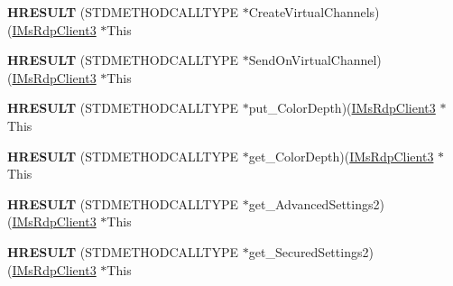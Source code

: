 \begin{DoxyCompactItemize}
\item 
\mbox{\label{struct_m_s_t_s_c_lib_1_1_i_ms_rdp_client3_vtbl_a3631c1ae51dd6c565051abc26541800d}} 
{\bfseries H\+R\+E\+S\+U\+LT} (S\+T\+D\+M\+E\+T\+H\+O\+D\+C\+A\+L\+L\+T\+Y\+PE $\ast$Create\+Virtual\+Channels)(\hyperlink{interface_m_s_t_s_c_lib_1_1_i_ms_rdp_client3}{I\+Ms\+Rdp\+Client3} $\ast$This
\item 
\mbox{\label{struct_m_s_t_s_c_lib_1_1_i_ms_rdp_client3_vtbl_ae84f077a75e3d63a4eda2acb2be5ecc7}} 
{\bfseries H\+R\+E\+S\+U\+LT} (S\+T\+D\+M\+E\+T\+H\+O\+D\+C\+A\+L\+L\+T\+Y\+PE $\ast$Send\+On\+Virtual\+Channel)(\hyperlink{interface_m_s_t_s_c_lib_1_1_i_ms_rdp_client3}{I\+Ms\+Rdp\+Client3} $\ast$This
\item 
\mbox{\label{struct_m_s_t_s_c_lib_1_1_i_ms_rdp_client3_vtbl_a34481798b381fbcd739f81d034606ba6}} 
{\bfseries H\+R\+E\+S\+U\+LT} (S\+T\+D\+M\+E\+T\+H\+O\+D\+C\+A\+L\+L\+T\+Y\+PE $\ast$put\+\_\+\+Color\+Depth)(\hyperlink{interface_m_s_t_s_c_lib_1_1_i_ms_rdp_client3}{I\+Ms\+Rdp\+Client3} $\ast$This
\item 
\mbox{\label{struct_m_s_t_s_c_lib_1_1_i_ms_rdp_client3_vtbl_aba402d5ea2b8f7d3ec2cf6477e00d201}} 
{\bfseries H\+R\+E\+S\+U\+LT} (S\+T\+D\+M\+E\+T\+H\+O\+D\+C\+A\+L\+L\+T\+Y\+PE $\ast$get\+\_\+\+Color\+Depth)(\hyperlink{interface_m_s_t_s_c_lib_1_1_i_ms_rdp_client3}{I\+Ms\+Rdp\+Client3} $\ast$This
\item 
\mbox{\label{struct_m_s_t_s_c_lib_1_1_i_ms_rdp_client3_vtbl_a8f5aecf69095f4f8102a2719c74065a9}} 
{\bfseries H\+R\+E\+S\+U\+LT} (S\+T\+D\+M\+E\+T\+H\+O\+D\+C\+A\+L\+L\+T\+Y\+PE $\ast$get\+\_\+\+Advanced\+Settings2)(\hyperlink{interface_m_s_t_s_c_lib_1_1_i_ms_rdp_client3}{I\+Ms\+Rdp\+Client3} $\ast$This
\item 
\mbox{\label{struct_m_s_t_s_c_lib_1_1_i_ms_rdp_client3_vtbl_a0a7b626f98e7cc9812939585dfe0546b}} 
{\bfseries H\+R\+E\+S\+U\+LT} (S\+T\+D\+M\+E\+T\+H\+O\+D\+C\+A\+L\+L\+T\+Y\+PE $\ast$get\+\_\+\+Secured\+Settings2)(\hyperlink{interface_m_s_t_s_c_lib_1_1_i_ms_rdp_client3}{I\+Ms\+Rdp\+Client3} $\ast$This

\end{DoxyCompactItemize}
